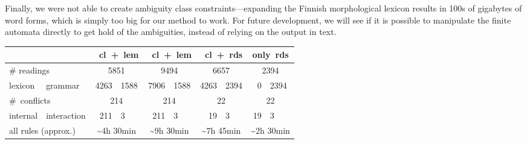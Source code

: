 {{Finally, we were not able to create ambiguity class constraints---expanding the Finnish morphological lexicon results in 100s of gigabytes of word forms, which is simply too big for our method to work. 
For future development, we will see if it is possible to manipulate the finite automata directly to get hold of the ambiguities, instead of relying on the output in text.




\def\oneClLG{{\sc 1~cl~+~lem}}
\def\twoClLG{{\sc 2~cl~+~lem}}
\def\oneClRG{{\sc 1~cl~+~rds}}
\def\allRG{{\sc only~rds}}

\def\wH{1.1cm}
\def\wdt{0.7cm}

\begin{table}[t]
\centering
\begin{tabular}{| p{\wH} @{~+~} p{\wH}  | r @{~+~} l  | r @{~+~} l  | r @{~+~} l  | r @{~+~} l  |}


\hline
\multicolumn{2}{|c|}{} & \multicolumn{2}{c|}{\oneClLG}
                              & \multicolumn{2}{c|}{\twoClLG}
                                              & \multicolumn{2}{c|}{\oneClRG}      				   & \multicolumn{2}{c|}{\allRG} \\ \hline
\multicolumn{2}{|l|}{\# readings}
              & \multicolumn{2}{c|}{5851}         
              				  & \multicolumn{2}{c|}{9494} 
              				  				  & \multicolumn{2}{c|}{6657}                & \multicolumn{2}{c|}{2394} \\
lexicon &
grammar   & 4263 & 1588 &  7906 & 1588  & 4263 & 2394  & 0 & 2394  \\ \hline
\multicolumn{2}{|l|}{\#~conflicts}
              & \multicolumn{2}{c|}{214}   
              				  & \multicolumn{2}{c|}{214}
              				                  & \multicolumn{2}{c|}{22}
              				                                  & \multicolumn{2}{c|}{22} \\
internal & 
 interaction & 211 & 3  & 211 & 3  & 19 & 3   &  19 & 3   \\ \hline

\multicolumn{2}{|l|}{\clock{} all 
       rules (approx.)}
             & \multicolumn{2}{c|}{\~{}4h 30min}
             		          & \multicolumn{2}{c|}{\~{}9h 30min}
             		          			     & \multicolumn{2}{c|}{\~{}7h 45min} 
             		          			     				&  \multicolumn{2}{c|}{\~{}2h 30min} \\ \hline



\end{tabular}
\end{table}}}

